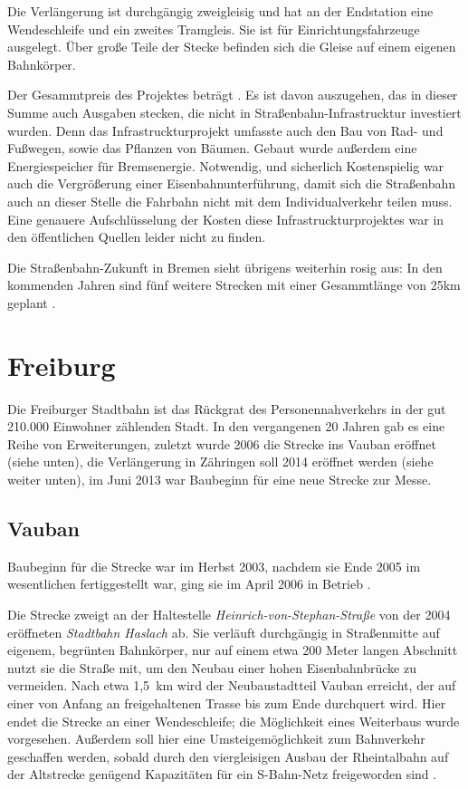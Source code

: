 Die Verlängerung ist durchgängig zweigleisig und hat an der Endstation eine Wendeschleife und ein zweites Tramgleis. Sie ist für Einrichtungsfahrzeuge ausgelegt. Über große Teile der Stecke befinden sich die Gleise auf einem eigenen Bahnkörper\cite{bBub11}. 

Der Gesammtpreis des Projektes beträgt . Es ist davon auszugehen, das in dieser Summe auch Ausgaben stecken, die nicht in Straßenbahn-Infrastrucktur investiert wurden. Denn das Infrastruckturprojekt umfasste auch den Bau von Rad- und Fußwegen, sowie das Pflanzen von Bäumen\cite{bNp10}. Gebaut wurde außerdem eine Energiespeicher für Bremsenergie\cite{bSv12}. Notwendig, und sicherlich Kostenspielig war auch die Vergrößerung einer Eisenbahnunterführung, damit sich die Straßenbahn auch an dieser Stelle die Fahrbahn nicht mit dem Individualverkehr teilen muss. Eine genauere Aufschlüsselung der Kosten diese Infrastruckturprojektes war in den öffentlichen Quellen leider nicht zu finden. 

Die Straßenbahn-Zukunft in Bremen sieht übrigens weiterhin rosig aus:
In den kommenden Jahren sind fünf weitere Strecken mit einer Gesammtlänge von 25km geplant \cite{bNp10}.


\section{Freiburg}

Die Freiburger Stadtbahn ist das Rückgrat des Personennahverkehrs in der gut 210.000 Einwohner zählenden Stadt. In den vergangenen 20 Jahren gab es eine Reihe von Erweiterungen, zuletzt wurde 2006 die Strecke ins Vauban eröffnet (siehe unten), die Verlängerung in Zähringen soll 2014 eröffnet werden (siehe weiter unten), im Juni 2013 war Baubeginn für eine neue Strecke zur Messe.

\subsection*{Vauban}

Baubeginn für die Strecke war im Herbst 2003, nachdem sie Ende 2005 im wesentlichen fertiggestellt war, ging sie im April 2006 in Betrieb \cite{FRabv}.

Die Strecke zweigt an der Haltestelle \textit{Heinrich-von-Stephan-Straße} von der 2004 eröffneten \textit{Stadtbahn Haslach} ab.
Sie verläuft durchgängig in Straßenmitte auf eigenem, begrünten Bahnkörper, nur auf einem etwa 200 Meter langen Abschnitt nutzt sie die Straße mit, um den Neubau einer hohen Eisenbahnbrücke zu vermeiden.
Nach etwa 1,5{\ }km wird der Neubaustadtteil Vauban erreicht, der auf einer von Anfang an freigehaltenen Trasse bis zum Ende durchquert wird.
Hier endet die Strecke an einer Wendeschleife; die Möglichkeit eines Weiterbaus wurde vorgesehen.
Außerdem soll hier eine Umsteigemöglichkeit zum Bahnverkehr geschaffen werden, sobald durch den viergleisigen Ausbau der Rheintalbahn auf der Altstrecke genügend Kapazitäten für ein S-Bahn-Netz freigeworden sind \cite{FRabv} \cite{beob}.

